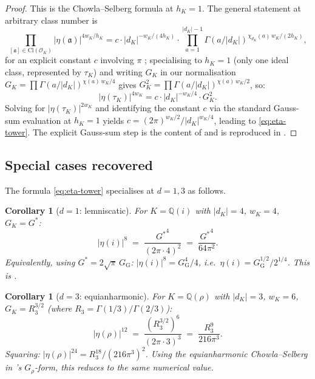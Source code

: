 \documentclass[11pt]{amsart}
\theoremstyle{plain}
\newtheorem{corollary}[theorem]{Corollary}
\theoremstyle{definition}
\theoremstyle{remark}
\newcommand{\Gs}{G^{*}}
\newcommand{\GG}{G_{\!\scriptscriptstyle\mathrm{G}}}
\newcommand{\GK}{G_{K}}
\newcommand{\Q}{\mathbb{Q}}
\begin{document}
\begin{proof}[Proof]
This is the Chowla--Selberg formula \cite{chowlaselberg} at $h_K = 1$.
The general statement at arbitrary class number is
\[
\prod_{[\mathfrak{a}] \in \mathrm{Cl}(\mathcal{O}_K)} |\eta(\mathfrak{a})|^{4 w_K / h_K}
   = c \cdot |d_K|^{-w_K/(4 h_K)} \cdot \prod_{a=1}^{|d_K|-1} \Gamma(a/|d_K|)^{\chi_{d_K}(a)\,w_K/(2 h_K)},
\]
for an explicit constant $c$ involving $\pi$ \cite{selberg-chowla-1967};
specialising to $h_K = 1$ (only one ideal class, represented by
$\tau_K$) and writing $\GK$ in our normalisation
$\GK = \prod \Gamma(a/|d_K|)^{\chi(a)\,w_K/4}$ gives
$\GK^{2} = \prod \Gamma(a/|d_K|)^{\chi(a)\,w_K/2}$, so:
\[
|\eta(\tau_K)|^{4 w_K} = c \cdot |d_K|^{-w_K/4} \cdot \GK^{2}.
\]
Solving for $|\eta(\tau_K)|^{2 w_K}$ and identifying the constant $c$ via
the standard Gauss-sum evaluation at $h_K = 1$ yields
$c = (2\pi)^{w_K/2}/|d_K|^{w_K/4}$, leading to \eqref{eq:eta-tower}. The
explicit Gauss-sum step is the content of \cite[Theorem 1]{selberg-chowla-1967}
and is reproduced in \cite[\S{}III]{cohen-NT-vol-2}.
\end{proof}

\subsection{Special cases recovered}

The formula \eqref{eq:eta-tower} specialises at $d = 1, 3$ as follows.

\begin{corollary}[$d = 1$: lemniscatic]\label{cor:eta-d1}
For $K = \Q(i)$ with $|d_K| = 4$, $w_K = 4$, $\GK = \Gs$:
\[
|\eta(i)|^{8} \;=\; \frac{{\Gs}^{4}}{(2\pi \cdot 4)^{2}} \;=\; \frac{{\Gs}^{4}}{64\pi^{2}}.
\]
Equivalently, using $\Gs = 2\sqrt{\pi}\,\GG$: $|\eta(i)|^{8} = \GG^{4}/4$,
i.e.\ $\eta(i) = \GG^{1/2}/2^{1/4}$. This is \cite[Cor.~9.2]{paper-gstar-A}.
\end{corollary}

\begin{corollary}[$d = 3$: equianharmonic]\label{cor:eta-d3}
For $K = \Q(\rho)$ with $|d_K| = 3$, $w_K = 6$, $\GK = R_{3}^{3/2}$ (where
$R_3 = \Gamma(1/3)/\Gamma(2/3)$):
\[
|\eta(\rho)|^{12} \;=\; \frac{(R_{3}^{3/2})^{6}}{(2\pi \cdot 3)^{3}}
                   \;=\; \frac{R_{3}^{9}}{216\pi^{3}}.
\]
Squaring: $|\eta(\rho)|^{24} = R_{3}^{18}/(216\pi^{3})^{2}$. Using the
equianharmonic Chowla--Selberg in \cite[\S 15]{paper-gstar-A}'s
$G_{\rho}$-form, this reduces to the same numerical value.
\end{corollary}
\end{document}

